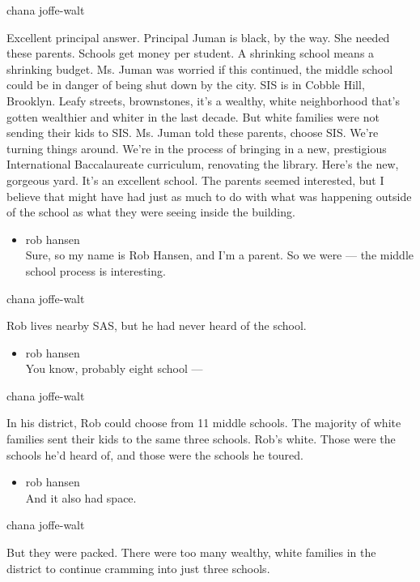 chana joffe-walt

Excellent principal answer. Principal Juman is black, by the way. She
needed these parents. Schools get money per student. A shrinking school
means a shrinking budget. Ms. Juman was worried if this continued, the
middle school could be in danger of being shut down by the city. SIS is
in Cobble Hill, Brooklyn. Leafy streets, brownstones, it's a wealthy,
white neighborhood that's gotten wealthier and whiter in the last
decade. But white families were not sending their kids to SIS. Ms. Juman
told these parents, choose SIS. We're turning things around. We're in
the process of bringing in a new, prestigious International
Baccalaureate curriculum, renovating the library. Here's the new,
gorgeous yard. It's an excellent school. The parents seemed interested,
but I believe that might have had just as much to do with what was
happening outside of the school as what they were seeing inside the
building.

\begin{itemize}
\tightlist
\item
  rob hansen\\
  Sure, so my name is Rob Hansen, and I'm a parent. So we were --- the
  middle school process is interesting.
\end{itemize}

chana joffe-walt

Rob lives nearby SAS, but he had never heard of the school.

\begin{itemize}
\tightlist
\item
  rob hansen\\
  You know, probably eight school ---
\end{itemize}

chana joffe-walt

In his district, Rob could choose from 11 middle schools. The majority
of white families sent their kids to the same three schools. Rob's
white. Those were the schools he'd heard of, and those were the schools
he toured.

\begin{itemize}
\tightlist
\item
  rob hansen\\
  And it also had space.
\end{itemize}

chana joffe-walt

But they were packed. There were too many wealthy, white families in the
district to continue cramming into just three schools.

